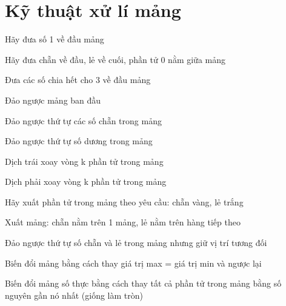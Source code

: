 \section{Kỹ thuật xử lí mảng}
\begin{problem}
    Hãy đưa số 1 về đầu mảng
\end{problem}
\begin{problem}
    Hãy đưa chẵn về đầu, lẻ về cuối, phần tử 0 nằm giữa mảng
\end{problem}
\begin{problem}
    Đưa các số chia hết cho 3 về đầu mảng
\end{problem}
\begin{problem}
    Đảo ngược mảng ban đầu
\end{problem}
\begin{problem}
    Đảo ngược thứ tự các số chẵn trong mảng
\end{problem}
\begin{problem}
    Đảo ngược thứ tự số dương trong mảng
\end{problem}
\begin{problem}
    Dịch trái xoay vòng k phần tử trong mảng
\end{problem}
\begin{problem}
    Dịch phải xoay vòng k phần tử trong mảng
\end{problem}
\begin{problem}
    Hãy xuất phần tử trong mảng theo yêu cầu: chẵn vàng, lẻ trắng
\end{problem}
\begin{problem}
    Xuất mảng: chẵn nằm trên 1 mảng, lẻ nằm trên hàng tiếp theo
\end{problem}
\begin{problem}
    Đảo ngược thứ tự số chẵn và lẻ trong mảng nhưng giữ vị trí tương đối
\end{problem}
\begin{problem}
    Biến đổi mảng bằng cách thay giá trị max = giá trị min và ngược lại
\end{problem}
\begin{problem}
    Biến đổi mảng  số thực bằng cách thay tất cả phần tử trong mảng bằng số nguyên gần nó nhất (giống làm tròn)
\end{problem}



